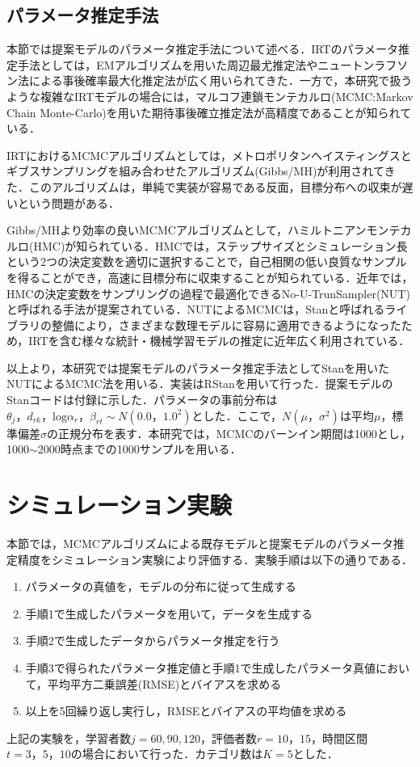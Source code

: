 \documentclass[a4paper,11pt,oneside,openany]{jsbook}
\begin{document}
\section{パラメータ推定手法}
本節では提案モデルのパラメータ推定手法について述べる．IRTのパラメータ推定手法としては，EMアルゴリズムを用いた周辺最尤推定法やニュートンラフソン法による事後確率最大化推定法が広く用いられてきた．一方で，本研究で扱うような複雑なIRTモデルの場合には，マルコフ連鎖モンテカルロ(MCMC:Markov Chain Monte-Carlo)を用いた期待事後確立推定法が高精度であることが知られている\cite{IRTUtoUeno,norm}．

IRTにおけるMCMCアルゴリズムとしては，メトロポリタンヘイスティングスとギブスサンプリングを組み合わせたアルゴリズム(Gibbs/MH)\cite{IRTUtoUeno,Patz,BiasUsami}が利用されてきた．このアルゴリズムは，単純で実装が容易である反面，目標分布への収束が遅いという問題がある\cite{Hoffman,Giroami}．

Gibbs/MHより効率の良いMCMCアルゴリズムとして，ハミルトニアンモンテカルロ(HMC)が知られている\cite{Rosenthal}．HMCでは，ステップサイズとシミュレーション長という2つの決定変数を適切に選択することで，自己相関の低い良質なサンプルを得ることができ，高速に目標分布に収束することが知られている\cite{Hoffman,Neal}．近年では，HMCの決定変数をサンプリングの過程で最適化できるNo-U-TrunSampler(NUT)\cite{Hoffman}と呼ばれる手法が提案されている．NUTによるMCMCは，Stan\cite{stan}と呼ばれるライブラリの整備により，さまざまな数理モデルに容易に適用できるようになったため，IRTを含む様々な統計・機械学習モデルの推定に近年広く利用されている\cite{Luo,Jiang,Matsura}．

以上より，本研究では提案モデルのパラメータ推定手法としてStanを用いたNUTによるMCMC法を用いる．実装はRStan\cite{rstan}を用いて行った．提案モデルのStanコードは付録に示した．パラメータの事前分布は$\theta_{j}，d_{rk}，\mathrm{log}\alpha_{r}，\beta_{rt}\sim N(0.0，1.0^{2})$とした．ここで，$N(\mu，\sigma^2)$は平均$\mu$，標準偏差$\sigma$の正規分布を表す．本研究では，MCMCのバーンイン期間は1000とし，1000$\sim$2000時点までの1000サンプルを用いる．

\newpage
\chapter{シミュレーション実験}

本節では，MCMCアルゴリズムによる既存モデルと提案モデルのパラメータ推定精度をシミュレーション実験により評価する．実験手順は以下の通りである．
\begin{enumerate}
\item パラメータの真値を，モデルの分布に従って生成する
\item 手順1で生成したパラメータを用いて，データを生成する
\item 手順2で生成したデータからパラメータ推定を行う
\item 手順3で得られたパラメータ推定値と手順1で生成したパラメータ真値において，平均平方二乗誤差(RMSE)とバイアスを求める
\item 以上を5回繰り返し実行し，RMSEとバイアスの平均値を求める
\end{enumerate}
上記の実験を，学習者数$j=60,90,120$，評価者数$r=10，15$，時間区間$t=3，5，10$の場合において行った．カテゴリ数は$K=5$とした．
\end{document}
